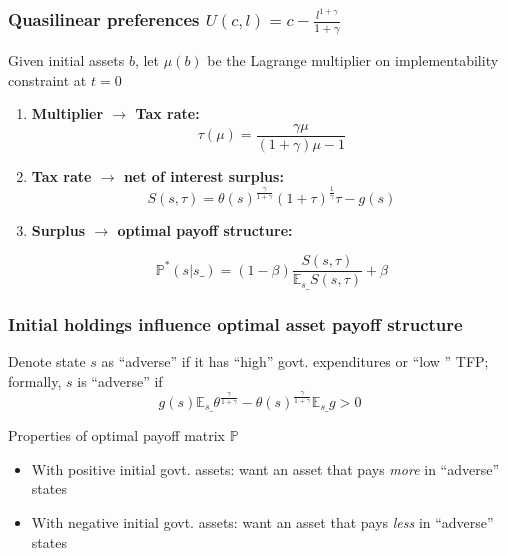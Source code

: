 \documentclass{beamer}
\newcommand{\EE}{\mathbb E}
\begin{document}
%
\begin{frame}
\frametitle{Quasilinear preferences $U(c,l)=c-\frac{l^{1+\gamma}}{1+\gamma}$}
Given initial assets $b$,  let $\mu(b)$ be the Lagrange multiplier on implementability constraint
at $t =0$
\begin{enumerate}

 \item \textbf{Multiplier $\to$ Tax rate:}
 \[
		\tau(\mu) = \frac{\gamma\mu}{(1+\gamma)\mu-1}
	\]
 \item \textbf{Tax rate $\to$ net of interest surplus:}
 \[
		S(s,\tau) = \theta(s)^\frac\gamma{1+\gamma}(1+\tau)^\frac1\gamma\tau-g(s)
	\]
\item \textbf{Surplus $\to$ optimal payoff structure:}

\[
 \mathbb{P}^*(s|s\_) = (1-\beta)\frac{S(s,\tau)}{\EE_{s\_} S(s,\tau)} + \beta
 \]

 \end{enumerate}

\end{frame}

%
% 		
\begin{frame}		
   \frametitle{Initial holdings influence optimal asset payoff structure}
Denote state $s$ as ``adverse''  if it has ``high'' govt. expenditures or ``low '' TFP; formally, $s$ is ``adverse'' if
\[   g(s)\EE_{s\_}\theta^\frac{\gamma}{1+\gamma}-\theta(s)^\frac\gamma{1+\gamma}\EE_{s\_} g >0\]

Properties of  optimal payoff matrix $\mathbb{P}$

\begin{itemize}
 \item With positive initial govt. assets: want an asset  that pays {\em more} in ``adverse'' states
 \item With negative initial govt. assets: want an asset  that pays {\em less} in ``adverse'' states
\end{itemize}
\end{frame}
\end{document}
